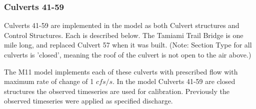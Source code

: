 %
%


\clearpage
\subsubsection{Culverts 41-59}

Culverts 41-59 are implemented in the model as both Culvert structures and Control Structures. Each is described below. The Tamiami Trail Bridge is one mile long, and replaced Culvert 57 when it was built. (Note: Section Type for all culverts is 'closed', meaning the roof of the culvert is not open to the air above.)

The M11 model implements each of these culverts with prescribed flow with maximum rate of change of 1 $cfs/s$. In the model Culverts 41-59 are closed structures the observed timeseries are used for calibration. Previously the observed timeseries were applied as specified discharge.

